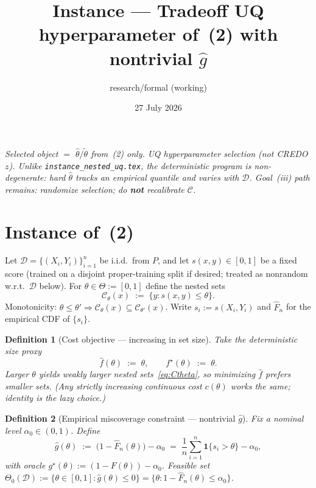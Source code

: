 \documentclass[11pt]{article}
\title{Instance --- Tradeoff UQ hyperparameter of~(2) with nontrivial $\hat g$}
\author{research/formal (working)}
\date{27 July 2026}
\newtheorem{definition}{Definition}
\begin{document}
\maketitle

\noindent\textit{Selected object $=$ $\hat\theta/\tilde\theta$ from~(2) only.
UQ hyperparameter selection (not CREDO $z$).
Unlike \texttt{instance\_nested\_uq.tex}, the deterministic program is
\emph{non-degenerate}: hard $\hat\theta$ tracks an empirical quantile and varies with $\mathcal{D}$.
Goal~(iii) path remains: randomize selection; do \textbf{not} recalibrate $\mathcal{C}$.}

\section{Instance of~(2)}

Let $\mathcal{D}=\{(X_i,Y_i)\}_{i=1}^n$ be i.i.d.\ from $P$, and let $s(x,y)\in[0,1]$ be a fixed score
(trained on a disjoint proper-training split if desired; treated as nonrandom w.r.t.\ $\mathcal{D}$ below).
For $\theta\in\Theta:=[0,1]$ define the nested sets
\begin{equation}
\label{eq:Ctheta}
\mathcal{C}_\theta(x)
\;:=\;
\{y:s(x,y)\le\theta\}.
\end{equation}
Monotonicity: $\theta\le\theta'\Rightarrow\mathcal{C}_\theta(x)\subseteq\mathcal{C}_{\theta'}(x)$.
Write $s_i:=s(X_i,Y_i)$ and $\widehat F_n$ for the empirical CDF of $\{s_i\}$.

\begin{definition}[Cost objective --- increasing in set size]
\label{def:fhat}
Take the deterministic size proxy
\[
\hat f(\theta)
\;:=\;
\theta,
\qquad
f^\star(\theta)\;:=\;\theta.
\]
Larger $\theta$ yields weakly larger nested sets~\eqref{eq:Ctheta}, so minimizing $\hat f$ prefers smaller sets.
(Any strictly increasing continuous cost $c(\theta)$ works the same; identity is the lazy choice.)
\end{definition}

\begin{definition}[Empirical miscoverage constraint --- nontrivial $\hat g$]
\label{def:ghat}
Fix a nominal level $\alpha_0\in(0,1)$. Define
\begin{equation}
\label{eq:ghat}
\hat g(\theta)
\;:=\;
\bigl(1-\widehat F_n(\theta)\bigr)-\alpha_0
\;=\;
\frac1n\sum_{i=1}^n \mathbf{1}\{s_i>\theta\}-\alpha_0,
\end{equation}
with oracle
$g^\star(\theta):=(1-F(\theta))-\alpha_0$.
Feasible set
$\Theta_0(\mathcal{D}):=\{\theta\in[0,1]:\hat g(\theta)\le 0\}
=\{\theta:1-\widehat F_n(\theta)\le\alpha_0\}$.
\end{definition}
\end{document}
